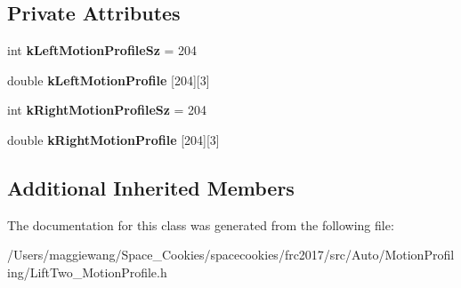 \subsection*{Private Attributes}
\begin{DoxyCompactItemize}
\item 
\mbox{\label{class_lift_two___motion_profile_a0879ecc00fb19e24b88dbf98265620be}} 
int {\bfseries k\+Left\+Motion\+Profile\+Sz} = 204
\item 
\mbox{\label{class_lift_two___motion_profile_afdf0a9aa9b87457b77d5310c6c7a8ad6}} 
double {\bfseries k\+Left\+Motion\+Profile} \mbox{[}204\mbox{]}\mbox{[}3\mbox{]}
\item 
\mbox{\label{class_lift_two___motion_profile_ac64febf8116e7553bf61639f50b14429}} 
int {\bfseries k\+Right\+Motion\+Profile\+Sz} = 204
\item 
\mbox{\label{class_lift_two___motion_profile_a8642c60479303174610b4dc72d734126}} 
double {\bfseries k\+Right\+Motion\+Profile} \mbox{[}204\mbox{]}\mbox{[}3\mbox{]}
\end{DoxyCompactItemize}
\subsection*{Additional Inherited Members}


The documentation for this class was generated from the following file\+:\begin{DoxyCompactItemize}
\item 
/\+Users/maggiewang/\+Space\+\_\+\+Cookies/spacecookies/frc2017/src/\+Auto/\+Motion\+Profiling/Lift\+Two\+\_\+\+Motion\+Profile.\+h\end{DoxyCompactItemize}

